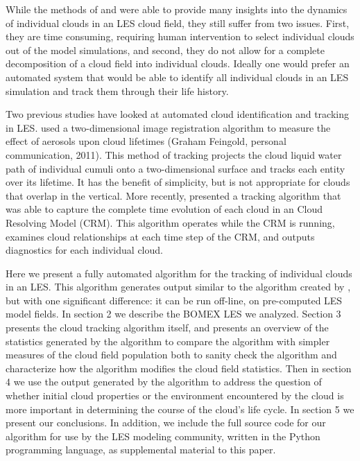 \documentclass[acp]{copernicus}
\begin{document}
While the methods of \citeauthor{Zhao2005} and \citeauthor{Heus2009} were 
able to provide many insights into the dynamics of individual clouds in an 
LES cloud field, they still suffer from two issues.  First, they are time 
consuming, requiring human intervention to select individual clouds out of 
the model simulations, and second, they do not allow for a complete 
decomposition of a cloud field into individual clouds.  Ideally one would 
prefer an automated system that would be able to identify all individual clouds 
in an LES simulation and track them through their life history.

Two previous studies have looked at automated cloud identification and tracking 
in LES. \cite{Jiang2006} used a two-dimensional image registration algorithm 
to measure the effect of aerosols upon cloud lifetimes (Graham Feingold, 
personal communication, 2011).  This method of tracking projects the cloud 
liquid water path of individual cumuli onto a two-dimensional surface and 
tracks each entity over its lifetime. It has the benefit of simplicity, but is 
not appropriate for clouds that overlap in the vertical.  More recently, 
\cite{Plant2009} presented a tracking algorithm that was able to capture the 
complete time evolution of each cloud in an Cloud Resolving Model (CRM). This 
algorithm operates while the CRM is running, examines cloud relationships at 
each time step of the CRM, and outputs diagnostics for each individual cloud.

Here we present a fully automated algorithm for the tracking of individual 
clouds in an LES. This algorithm generates output similar to the algorithm 
created by \cite{Plant2009}, but with one significant difference: it can be 
run off-line, on pre-computed LES model fields.  In section 2 we describe the 
BOMEX LES we analyzed.  Section 3 presents the cloud tracking algorithm itself, 
and presents an overview of the statistics generated by the algorithm to compare 
the algorithm with simpler measures of the cloud field population both to 
sanity check the algorithm and characterize how the algorithm modifies the 
cloud field statistics.  Then in section 4 we use the output generated by the
algorithm to address the question of whether initial cloud properties or the
environment encountered by the cloud is more important in determining the 
course of the cloud's life cycle.  In section 5 we present our conclusions.  In
addition, we include the full source code for our algorithm for use by the LES
modeling community, written in the Python programming language, as supplemental
material to this paper.
\end{document}
